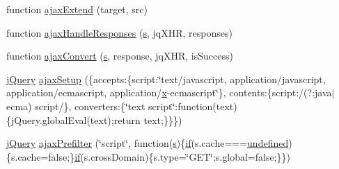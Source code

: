 \begin{DoxyCompactItemize}
function \hyperlink{jquery-1_8x_8js_a113ade43cfd5328ebd5ccc84f45fe4de}{ajax\+Extend} (target, src)
\item 
function \hyperlink{jquery-1_8x_8js_a71c2db7846f21963cee426cb81003c63}{ajax\+Handle\+Responses} (\hyperlink{respond_8min_8js_ad9a7d92cb87932d25187fdec3ba1b621}{s}, jq\+X\+HR, responses)
\item 
function \hyperlink{jquery-1_8x_8js_a549518271b8708165811ae69c274b58a}{ajax\+Convert} (\hyperlink{respond_8min_8js_ad9a7d92cb87932d25187fdec3ba1b621}{s}, response, jq\+X\+HR, is\+Success)
\item 
\hyperlink{xe__solid__enterprise__login_2js_2login_8js_a5d40f04b6bb824963a42ec4b5fbfe262}{j\+Query} \hyperlink{jquery-1_8x_8js_a52a40924d02e0d9756f051e36a640cd6}{ajax\+Setup} (\{accepts\+:\{script\+:\char`\"{}text/javascript, application/javascript, application/ecmascript, application/\hyperlink{jquery-1_8x_8min_8js_a5ce50d751c9664d05375c8f5080ed43e}{x}-\/ecmascript\char`\"{}\}, contents\+:\{script\+:/(?\+:java$\vert$ecma) script/\}, converters\+:\{\char`\"{}text script\char`\"{}\+:function(text)\{j\+Query.\+global\+Eval(text);return text;\}\}\})
\item 
\hyperlink{xe__solid__enterprise__login_2js_2login_8js_a5d40f04b6bb824963a42ec4b5fbfe262}{j\+Query} \hyperlink{jquery-1_8x_8js_a144939e373cc1ad511a53c4251ec7ffa}{ajax\+Prefilter} (\char`\"{}script\char`\"{}, function(\hyperlink{respond_8min_8js_ad9a7d92cb87932d25187fdec3ba1b621}{s})\{\hyperlink{menu_2tpl_2js_2jquery_8jstree_8js_acba95bef569cfaee32c4ed0212b2bb92}{if}(s.\+cache===\hyperlink{menu_2tpl_2js_2jquery_8tmpl_8js_a08113a236cc18d2a9d5ce27e638012be}{undefined})\{s.\+cache=false;\}\hyperlink{menu_2tpl_2js_2jquery_8jstree_8js_acba95bef569cfaee32c4ed0212b2bb92}{if}(s.\+cross\+Domain)\{s.\+type=\char`\"{}G\+ET\char`\"{};s.\+global=false;\}\})
\item 

\end{DoxyCompactItemize}
